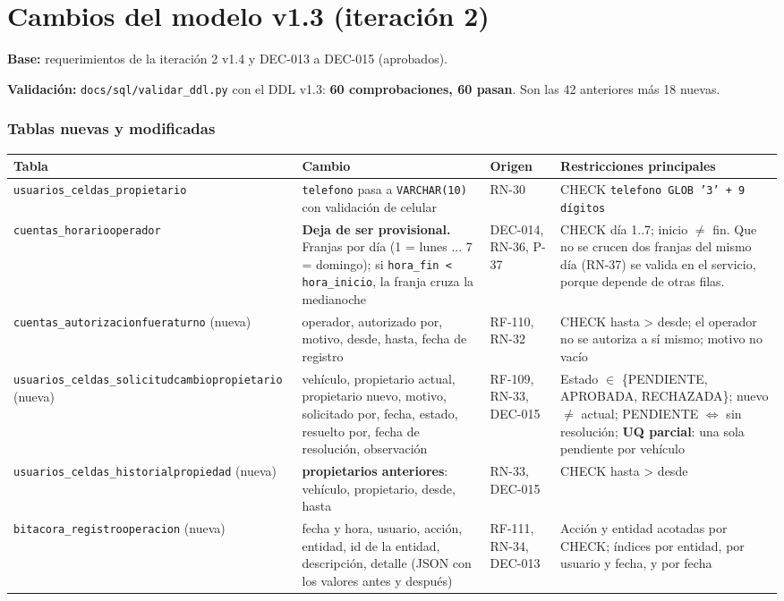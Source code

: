\section{Cambios del modelo v1.3 (iteración 2)}
\textbf{Base:} requerimientos de la iteración 2 v1.4 y DEC-013 a DEC-015 (aprobados).

\textbf{Validación:} \texttt{docs/sql/validar\_ddl.py} con el DDL v1.3: \textbf{60 comprobaciones, 60 pasan}. Son las 42 anteriores más 18 nuevas.


\subsubsection{Tablas nuevas y modificadas}

\begin{longtable}{>{\raggedright\arraybackslash}p{1.8cm}>{\raggedright\arraybackslash}p{5.8cm}>{\raggedright\arraybackslash}p{1.6cm}>{\raggedright\arraybackslash}p{5.2cm}}
\toprule
\textbf{Tabla} & \textbf{Cambio} & \textbf{Origen} & \textbf{Restricciones principales}\\
\midrule\endhead
\texttt{usuarios\_celdas\_propietario} & \texttt{telefono} pasa a \texttt{VARCHAR(10)} con validación de celular & RN-30 & CHECK \texttt{telefono GLOB '3' + 9 dígitos}\\
\texttt{cuentas\_horariooperador} & \textbf{Deja de ser provisional.} Franjas por día (1 = lunes ... 7 = domingo); si \texttt{hora\_fin < hora\_inicio}, la franja cruza la medianoche & DEC-014, RN-36, P-37 & CHECK día 1..7; inicio $\neq$ fin. Que no se crucen dos franjas del mismo día (RN-37) se valida en el servicio, porque depende de otras filas.\\
\texttt{cuentas\_autorizacionfueraturno} (nueva) & operador, autorizado por, motivo, desde, hasta, fecha de registro & RF-110, RN-32 & CHECK hasta > desde; el operador no se autoriza a sí mismo; motivo no vacío\\
\texttt{usuarios\_celdas\_solicitudcambiopropietario} (nueva) & vehículo, propietario actual, propietario nuevo, motivo, solicitado por, fecha, estado, resuelto por, fecha de resolución, observación & RF-109, RN-33, DEC-015 & Estado $\in$ \{PENDIENTE, APROBADA, RECHAZADA\}; nuevo $\neq$ actual; PENDIENTE $\Leftrightarrow$ sin resolución; \textbf{UQ parcial}: una sola pendiente por vehículo\\
\texttt{usuarios\_celdas\_historialpropiedad} (nueva) & \textbf{propietarios anteriores}: vehículo, propietario, desde, hasta & RN-33, DEC-015 & CHECK hasta > desde\\
\texttt{bitacora\_registrooperacion} (nueva) & fecha y hora, usuario, acción, entidad, id de la entidad, descripción, detalle (JSON con los valores antes y después) & RF-111, RN-34, DEC-013 & Acción y entidad acotadas por CHECK; índices por entidad, por usuario y fecha, y por fecha\\
\bottomrule
\end{longtable}



